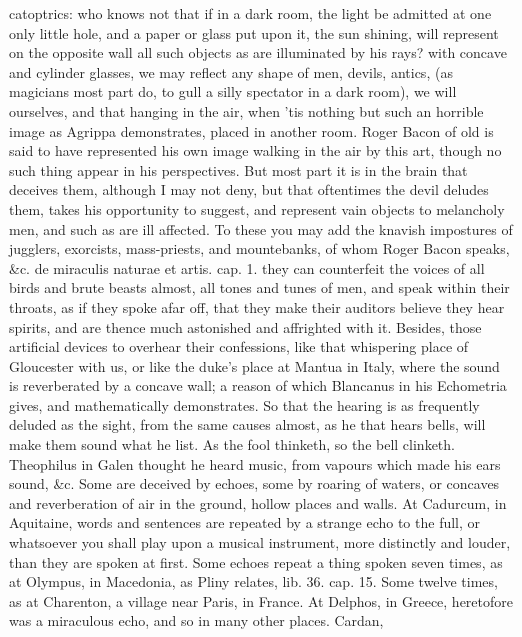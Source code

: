 {catoptrics: who knows not that if in a dark room, the light be admitted
at one only little hole, and a paper or glass put upon it, the sun
shining, will represent on the opposite wall all such objects as are
illuminated by his rays? with concave and cylinder glasses, we may
reflect any shape of men, devils, antics, (as magicians most part do,
to gull a silly spectator in a dark room), we will ourselves, and that
hanging in the air, when 'tis nothing but such an horrible image as
Agrippa demonstrates, placed in another room. Roger Bacon of old
is said to have represented his own image walking in the air by this
art, though no such thing appear in his perspectives. But most part it
is in the brain that deceives them, although I may not deny, but that
oftentimes the devil deludes them, takes his opportunity to suggest,
and represent vain objects to melancholy men, and such as are ill
affected. To these you may add the knavish impostures of jugglers,
exorcists, mass-priests, and mountebanks, of whom Roger Bacon speaks,
\&c. de miraculis naturae et artis. cap. 1. they can counterfeit
the voices of all birds and brute beasts almost, all tones and tunes of
men, and speak within their throats, as if they spoke afar off, that
they make their auditors believe they hear spirits, and are thence much
astonished and affrighted with it. Besides, those artificial devices to
overhear their confessions, like that whispering place of Gloucester
with us, or like the duke's place at Mantua in Italy, where the
sound is reverberated by a concave wall; a reason of which Blancanus in
his Echometria gives, and mathematically demonstrates.
So that the hearing is as frequently deluded as the sight, from the
same causes almost, as he that hears bells, will make them sound what
he list. As the fool thinketh, so the bell clinketh. Theophilus in
Galen thought he heard music, from vapours which made his ears sound,
\&c. Some are deceived by echoes, some by roaring of waters, or concaves
and reverberation of air in the ground, hollow places and walls.
At Cadurcum, in Aquitaine, words and sentences are repeated by a
strange echo to the full, or whatsoever you shall play upon a musical
instrument, more distinctly and louder, than they are spoken at first.
Some echoes repeat a thing spoken seven times, as at Olympus, in
Macedonia, as Pliny relates, lib. 36. cap. 15. Some twelve times, as at
Charenton, a village near Paris, in France. At Delphos, in Greece,
heretofore was a miraculous echo, and so in many other places. Cardan,
}
